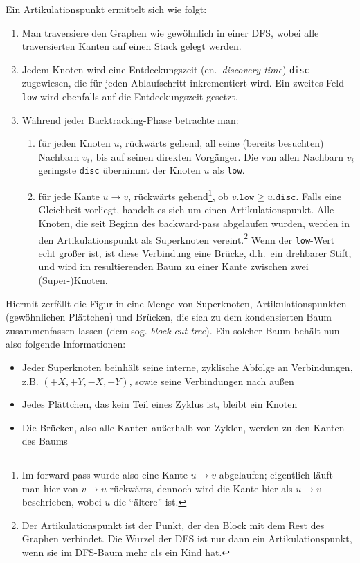 \documentclass[a4paper,10pt,ngerman]{scrartcl}
\begin{document}
    Ein Artikulationspunkt ermittelt sich wie folgt:
    \begin{enumerate}
        \item Man traversiere den Graphen wie gewöhnlich in einer DFS, wobei alle traversierten Kanten auf einen Stack
        gelegt werden.
        \item Jedem Knoten wird eine Entdeckungszeit (en.\ \textit{discovery time}) \texttt{disc} zugewiesen, die für
        jeden Ablaufschritt inkrementiert wird. Ein zweites Feld \texttt{low} wird ebenfalls auf die Entdeckungszeit
        gesetzt.
        \item Während jeder Backtracking-Phase betrachte man:
        \begin{enumerate}
            \item für jeden Knoten $u$, rückwärts gehend, all seine (bereits besuchten) Nachbarn $v_i$, bis auf seinen
            direkten Vorgänger. Die von allen Nachbarn $v_i$ geringste \texttt{disc} übernimmt der Knoten $u$
            als \texttt{low}.
            \item für jede Kante $u \to v$, rückwärts gehend\footnote{Im forward-pass wurde also eine Kante $u \to v$
                abgelaufen; eigentlich läuft man hier von $v \to u$ rückwärts, dennoch wird die Kante hier als
                $u \to v$ beschrieben, wobei $u$ die ``ältere'' ist.},
            ob $v.\texttt{low} \geq u.\texttt{disc}$. Falls eine Gleichheit vorliegt, handelt es sich um einen
            Artikulationspunkt. Alle Knoten, die seit Beginn des backward-pass abgelaufen wurden, werden in den
            Artikulationspunkt als Superknoten vereint.\footnote{Der Artikulationspunkt ist der Punkt, der den Block mit
            dem Rest des Graphen verbindet. Die Wurzel der DFS ist nur dann ein Artikulationspunkt, wenn sie im
            DFS-Baum mehr als ein Kind hat.}
            Wenn der \texttt{low}-Wert echt größer ist, ist diese
            Verbindung eine Brücke, d.h.\ ein drehbarer Stift, und wird im resultierenden Baum zu einer Kante zwischen
            zwei (Super-)Knoten.
        \end{enumerate}
    \end{enumerate}

    Hiermit zerfällt die Figur in eine Menge von Superknoten, Artikulationspunkten (gewöhnlichen Plättchen) und Brücken,
    die sich zu dem kondensierten Baum zusammenfassen lassen (dem sog. \textit{block-cut tree}).
    Ein solcher Baum behält nun also folgende Informationen:
    \begin{itemize}
        \item Jeder Superknoten beinhält seine interne, zyklische Abfolge an Verbindungen, z.B. $(+X, +Y, -X, -Y)$,
        sowie seine Verbindungen nach außen
        \item Jedes Plättchen, das kein Teil eines Zyklus ist, bleibt ein Knoten
        \item Die Brücken, also alle Kanten außerhalb von Zyklen, werden zu den Kanten des Baums
    \end{itemize}
\end{document}
